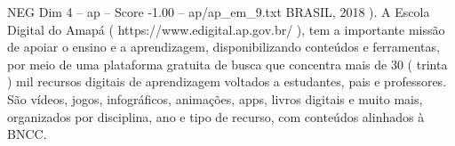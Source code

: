 \begin{textsample}{NEG Dim 4 – ap – Score -1.00 – ap/ap\_em\_9.txt}
BRASIL, 2018 ).
A Escola Digital do Amapá ( https://www.edigital.ap.gov.br/ ), tem a importante missão de apoiar o ensino e a aprendizagem, disponibilizando conteúdos e ferramentas, por meio de uma plataforma gratuita de busca que concentra mais de 30 ( trinta ) mil recursos digitais de aprendizagem voltados a estudantes, pais e professores.
São vídeos, jogos, infográficos, animações, apps, livros digitais e muito mais, organizados por disciplina, ano e tipo de recurso, com conteúdos alinhados à BNCC.

\end{textsample}
